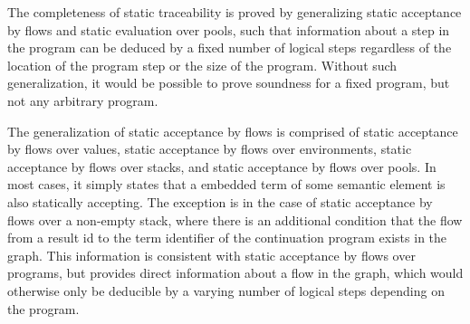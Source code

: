\documentclass[10pt]{article}
\begin{document}
The completeness of static traceability is proved by generalizing
static acceptance by flows and static evaluation over pools, such that information about a step in
the program can be deduced by a fixed number of logical steps regardless of the location of the
program step or the size of the program. Without such generalization, it would be possible to
prove soundness for a fixed program, but not any arbitrary program.

The generalization of static acceptance by flows is comprised of static acceptance by flows over values,
static acceptance by flows over environments, static acceptance by flows over stacks, and static
acceptance by flows over pools.
In most cases, it simply states that a embedded term of some semantic element is also statically
accepting. The exception is in the case of
static acceptance by flows over a non-empty stack, where
there is an additional condition that the flow
from a result id to the term identifier
of the continuation program exists in the graph.
This information is consistent with static
acceptance by flows over programs, but provides direct information about a flow in the
graph, which would otherwise only be deducible by a varying number of logical steps
depending on the program.
\end{document}
